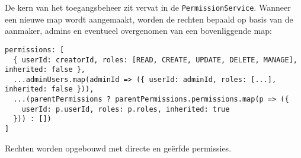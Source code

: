 De kern van het toegangsbeheer zit vervat in de \texttt{PermissionService}. Wanneer een nieuwe map wordt aangemaakt, worden de rechten bepaald op basis van de aanmaker, admins en eventueel overgenomen van een bovenliggende map:

\begin{listing}[H]
\begin{verbatim}
permissions: [
  { userId: creatorId, roles: [READ, CREATE, UPDATE, DELETE, MANAGE], inherited: false },
  ...adminUsers.map(adminId => ({ userId: adminId, roles: [...], inherited: false })),
  ...(parentPermissions ? parentPermissions.permissions.map(p => ({
    userId: p.userId, roles: p.roles, inherited: true
  })) : [])
]
\end{verbatim}
\caption[Opbouw van permissies bij mapcreatie]{Rechten worden opgebouwd met directe en geërfde permissies.}
\end{listing}
